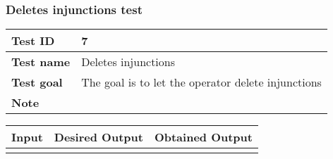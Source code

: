 {{		\subsubsection{Deletes injunctions test}{
			\begin{center}
			\begin{tabular}{|p{4cm}|p{10cm}|}
			\hline
				\centering \vspace{1mm} \bfseries{Test ID} \vspace{1mm} & 
				\vspace{1mm} 7 \vspace{1mm}\\
			\hline
				\centering \vspace{1mm} \bfseries{Test name} \vspace{1mm} & 
				\vspace{1mm} Deletes injunctions \vspace{1mm}\\
			\hline
				\centering \vspace{1mm} \bfseries{Test goal} \vspace{1mm} & 
				\vspace{1mm} The goal is to let the operator delete injunctions\vspace{1mm}\\
			\hline
				\centering \vspace{1mm} \bfseries{Note} \vspace{1mm} & 
				\vspace{1mm}  \vspace{1mm}\\
			\hline
			\end{tabular}

			\begin{tabular}{|p{4cm}|p{5cm}|p{5cm}|}
			\hline
			\centering \vspace{1mm} \bfseries{Input} \vspace{1mm} & \vspace{1mm} \bfseries{Desired Output} \vspace{1mm} & \vspace{1mm} \bfseries{Obtained Output} \vspace{1mm}\\
			\hline
				\vspace{1mm}  \vspace{1mm} &
				\vspace{1mm}  \vspace{1mm} & 
				\vspace{1mm}  \vspace{1mm} \\
			\hline
			\end{tabular}
			\end{center}
		}
		\clearpage

}}
